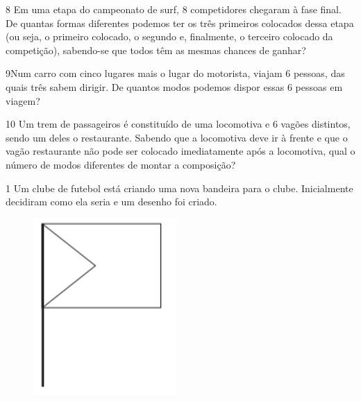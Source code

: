 \bigskip\bigskip

\num{8} Em uma etapa do campeonato de surf, 8 competidores chegaram à fase
final. De quantas formas diferentes podemos ter os três primeiros
colocados dessa etapa (ou seja, o primeiro colocado, o segundo e,
finalmente, o terceiro colocado da competição), sabendo-se que todos
têm as mesmas chances de ganhar?

\bigskip\bigskip

\num{9}Num carro com cinco lugares mais o lugar do motorista, viajam 6
pessoas, das quais três sabem dirigir. De quantos modos podemos dispor
essas 6 pessoas em viagem?

\bigskip\bigskip

\num{10} Um trem de passageiros é constituído de uma locomotiva e 6 vagões
distintos, sendo um deles o restaurante. Sabendo que a locomotiva deve ir
à frente e que o vagão restaurante não pode ser colocado imediatamente
após a locomotiva, qual o número de modos diferentes de montar a composição?


\pagebreak
{}

\num{1} Um clube de futebol está criando uma nova bandeira para o clube.
Inicialmente decidiram como ela seria e um desenho foi criado.

\begin{figure}[htpb!]
\centering
\includegraphics[width=.35\textwidth]{./imgs/mat16.png}
\end{figure}

